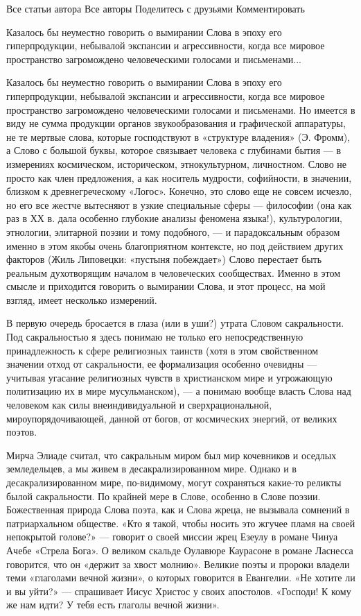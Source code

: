 Все статьи автора
Все авторы
Поделитесь с друзьями
Комментировать

Казалось бы неуместно говорить о вымирании Слова в эпоху его гиперпродукции, небывалой экспансии и агрессивности, когда все мировое пространство загромождено человеческими голосами и письменами...

Казалось бы неуместно говорить о вымирании Слова в эпоху его гиперпродукции, небывалой экспансии и агрессивности, когда все мировое пространство загромождено человеческими голосами и письменами. Но имеется в виду не сумма продукции органов звукообразования и графической аппаратуры, не те мертвые слова, которые господствуют в «структуре владения»
(Э. Фромм), а Слово с большой буквы, которое связывает человека с глубинами бытия --- в измерениях космическом, историческом, этнокультурном, личностном. Слово не просто как член предложения, а как носитель мудрости, софийности, в значении, близком к древнегреческому «Логос». Конечно, это слово еще не совсем исчезло, но его все жестче вытесняют в узкие специальные сферы --- философии (она как раз в ХХ в. дала особенно глубокие анализы феномена языка!), культурологии, этнологии, элитарной поэзии и тому подобного, --- и парадоксальным образом именно в этом якобы очень благоприятном контексте, но под действием других факторов (Жиль Липовецки: «пустыня побеждает») Слово перестает быть реальным духотворящим началом в человеческих сообществах. Именно в этом смысле и приходится говорить о вымирании Слова, и этот процесс, на мой взгляд, имеет несколько измерений.

В первую очередь бросается в глаза (или в уши?) утрата Словом сакральности. Под сакральностью я здесь понимаю не только его непосредственную принадлежность к сфере религиозных таинств (хотя в этом свойственном значении отход от сакральности, ее формализация особенно очевидны --- учитывая угасание религиозных чувств в христианском мире и угрожающую политизацию их в мире мусульманском), --- а понимаю вообще власть Слова над человеком как силы внеиндивидуальной и сверхрациональной, мироупорядочивающей, данной от богов, от космических энергий, от великих поэтов.

Мирча Элиаде считал, что сакральным миром был мир кочевников и оседлых земледельцев, а мы живем в десакрализированном мире. Однако и в десакрализированном мире, по-видимому, могут сохраняться какие-то реликты былой сакральности. По крайней мере в Слове, особенно в Слове поэзии. Божественная природа Слова поэта, как и Слова жреца, не вызывала сомнений в патриархальном обществе. «Кто я такой, чтобы носить это жгучее пламя на своей непокрытой голове?» --- говорит о своей миссии жрец Езеулу в романе Чинуа Ачебе «Стрела Бога». О великом скальде Оулавюре Каурасоне в романе Ласнесса говорится, что он «держит за хвост молнию». Великие поэты и пророки владели теми «глаголами вечной жизни», о которых говорится в Евангелии. «Не хотите ли и вы уйти?» --- спрашивает Иисус Христос у своих апостолов. «Господи! К кому же нам идти? У тебя есть глаголы вечной жизни».

